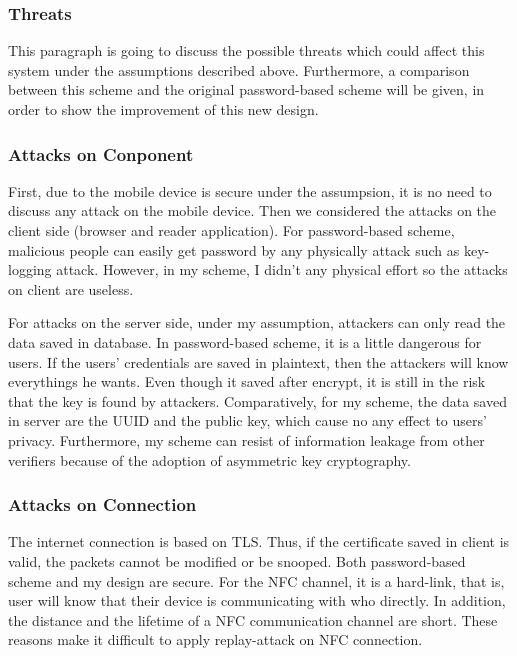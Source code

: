 \begin{CJK}{Bg5}{bsmi}
\subsubsection{Threats}

This paragraph is going to discuss the possible threats which could affect this system under the assumptions described above. Furthermore, a comparison between this scheme and the original password-based scheme will be given, in order to show the improvement of this new design.

\subsubsection{Attacks on Conponent}

First, due to the mobile device is secure under the assumpsion, it is no need to discuss any attack on the mobile device. Then we considered the attacks on the client side (browser and reader application). For password-based scheme, malicious people can easily get password by any physically attack such as key-logging attack. However, in my scheme, I didn't any physical effort so the attacks on client are useless.

For attacks on the server side, under my assumption, attackers can only read the data saved in database. In password-based scheme, it is a little dangerous for users. If the users' credentials are saved in plaintext, then the attackers will know everythings he wants. Even though it saved after encrypt, it is still in the risk that the key is found by attackers. Comparatively, for my scheme, the data saved in server are the UUID and the public key, which cause no any effect to users' privacy. Furthermore, my scheme can resist of information leakage from other verifiers because of the adoption of asymmetric key cryptography.

\subsubsection{Attacks on Connection}

The internet connection is based on TLS. Thus, if the certificate saved in client is valid, the packets cannot be modified or be snooped. Both password-based scheme and my design are secure. For the NFC channel, it is a hard-link, that is, user will know that their device is communicating with who directly. In addition, the distance and the lifetime of a NFC communication channel are short. These reasons make it difficult to apply replay-attack on NFC connection. 


\end{CJK}
